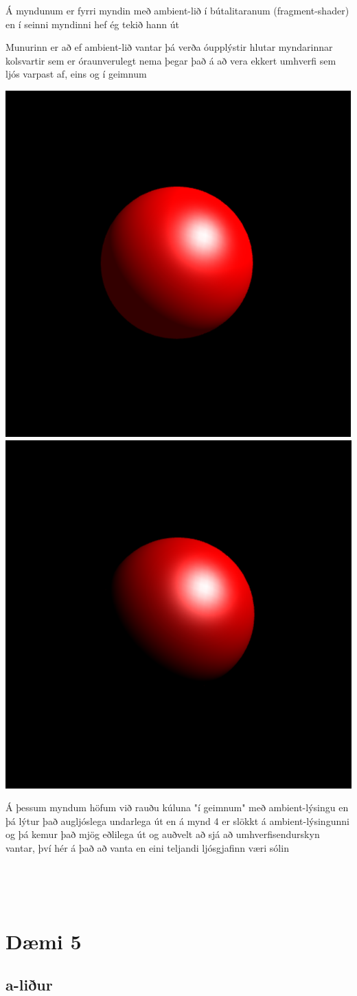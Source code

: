 \documentclass[11pt,twocolumn]{article}
\begin{document}
Á myndunum er fyrri myndin með ambient-lið í bútalitaranum (fragment-shader) en í seinni myndinni hef ég tekið hann út

Munurinn er að ef ambient-lið vantar þá verða óupplýstir hlutar myndarinnar kolsvartir sem er óraunverulegt nema þegar það á að vera ekkert umhverfi sem ljós varpast af, eins og í geimnum


\includegraphics[width = 0.45\linewidth]{3.png}
\includegraphics[width = 0.45\linewidth]{4.png}

Á þessum myndum  höfum við rauðu kúluna "í geimnum" með ambient-lýsingu  en þá lýtur það augljóslega undarlega út en á mynd 4 er slökkt á ambient-lýsingunni og þá kemur það mjög eðlilega út og auðvelt að sjá að umhverfisendurskyn  vantar, því hér á það að vanta en eini teljandi ljósgjafinn væri sólin


\newpage

\

\newpage

\

\section*{Dæmi 5}

\subsection*{a-liður}
\end{document}
